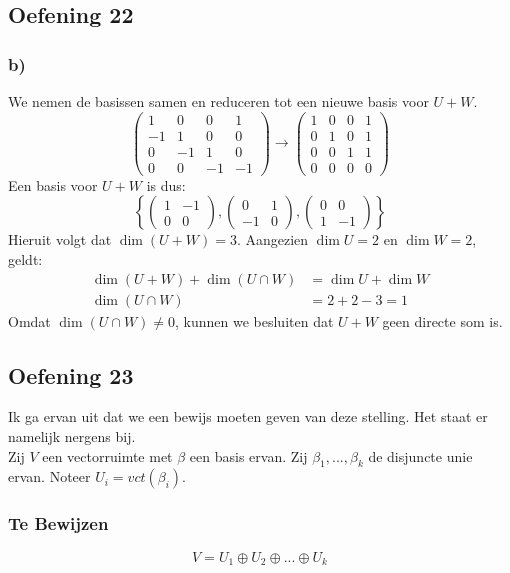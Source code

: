 \documentclass[lineaire_algebra_oplossingen.tex]{subfiles}
\begin{document}
\subsection{Oefening 22}
\subsubsection*{b)}
We nemen de basissen samen en reduceren tot een nieuwe basis voor $U+W$.
\[
\begin{pmatrix}
 1 &  0 &  0 &  1 \\
-1 &  1 &  0 &  0 \\
 0 & -1 &  1 &  0 \\
 0 &  0 & -1 & -1
\end{pmatrix}
\longrightarrow
\begin{pmatrix}
1 & 0 & 0 & 1 \\
0 & 1 & 0 & 1 \\
0 & 0 & 1 & 1 \\
0 & 0 & 0 & 0
\end{pmatrix}
\]
Een basis voor $U+W$ is dus:
\[
\left\{
\begin{pmatrix}
1 & -1 \\
0 &  0
\end{pmatrix},
\begin{pmatrix}
 0 & 1 \\
-1 & 0
\end{pmatrix},
\begin{pmatrix}
0 &  0 \\
1 & -1
\end{pmatrix}
\right\}
\]
Hieruit volgt dat $\dim(U+W) = 3$. Aangezien $\dim U = 2$ en $\dim W = 2$, geldt:
\begin{align*}
\dim(U+W) + \dim(U \cap W) &= \dim U + \dim W \\
\dim(U \cap W) &= 2+2-3 = 1
\end{align*}
Omdat $\dim(U \cap W) \neq 0$, kunnen we besluiten dat $U+W$ geen directe som is.
\subsection{Oefening 23}
Ik ga ervan uit dat we een bewijs moeten geven van deze stelling. Het staat er namelijk nergens bij.\\
Zij $V$ een vectorruimte met $\beta$ een basis ervan. Zij $\beta_1,...,\beta_k$ de disjuncte unie ervan. Noteer $U_i=vct(\beta_i)$.
\subsubsection*{Te Bewijzen}
\[
V = U_1 \oplus U_2 \oplus ... \oplus U_k
\]
\end{document}
